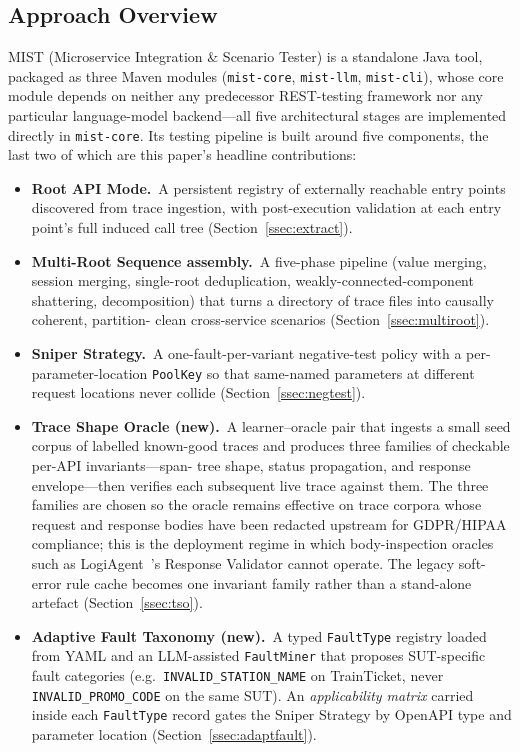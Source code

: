 \documentclass[conference]{IEEEtran}
\begin{document}
\subsection*{Approach Overview}
\textsc{MIST} (Microservice Integration \& Scenario Tester) is a
standalone Java tool, packaged as three Maven modules
(\texttt{mist-core}, \texttt{mist-llm}, \texttt{mist-cli}), whose core
module depends on neither any predecessor REST-testing framework nor any
particular language-model backend---all five architectural stages are
implemented directly in \texttt{mist-core}.  Its testing pipeline is built around
five components, the last two of which are this paper's headline
contributions:

\begin{itemize}[leftmargin=*]
  \item \textbf{Root API Mode.}~A persistent registry of externally
        reachable entry points discovered from trace ingestion, with
        post-execution validation at each entry point's full induced
        call tree (Section~\ref{ssec:extract}).
  \item \textbf{Multi-Root Sequence assembly.}~A five-phase pipeline
        (value merging, session merging, single-root deduplication,
        weakly-connected-component shattering, decomposition) that turns
        a directory of trace files into causally coherent, partition-
        clean cross-service scenarios (Section~\ref{ssec:multiroot}).
  \item \textbf{Sniper Strategy.}~A one-fault-per-variant negative-test
        policy with a per-parameter-location \texttt{PoolKey} so that
        same-named parameters at different request locations never
        collide (Section~\ref{ssec:negtest}).
  \item \textbf{Trace Shape Oracle (new).}~A learner--oracle pair that
        ingests a small seed corpus of labelled known-good traces and
        produces three families of checkable per-API invariants---span-
        tree shape, status propagation, and response envelope---then
        verifies each subsequent live trace against them.  The three
        families are chosen so the oracle remains effective on trace
        corpora whose request and response bodies have been redacted
        upstream for GDPR/HIPAA compliance; this is the deployment
        regime in which body-inspection oracles such as
        LogiAgent~\cite{zhang2025logiagent}'s Response Validator cannot
        operate.  The legacy soft-error rule cache becomes one invariant
        family rather than a stand-alone artefact
        (Section~\ref{ssec:tso}).
  \item \textbf{Adaptive Fault Taxonomy (new).}~A typed
        \texttt{FaultType} registry loaded from YAML and an LLM-assisted
        \texttt{FaultMiner} that proposes SUT-specific fault categories
        (e.g.\ \texttt{INVALID\_STATION\_NAME} on TrainTicket, never
        \texttt{INVALID\_PROMO\_CODE} on the same SUT).  An
        \emph{applicability matrix} carried inside each \texttt{FaultType}
        record gates the Sniper Strategy by OpenAPI type and parameter
        location (Section~\ref{ssec:adaptfault}).
\end{itemize}
\end{document}
